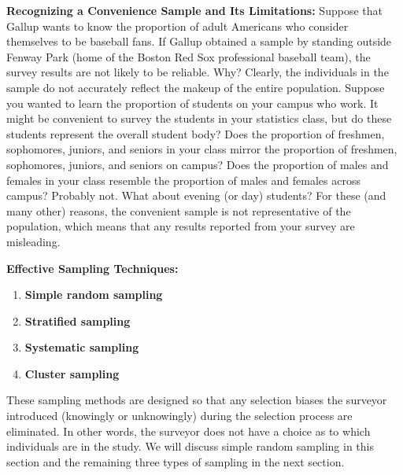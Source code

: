 \documentclass{report}
\begin{document}
        \bigbreak \noindent 
        \textbf{Recognizing a Convenience Sample and Its Limitations:}
        \bigbreak \noindent 
        Suppose that Gallup wants to know the proportion of adult Americans who consider themselves to be baseball fans. If Gallup obtained a sample by standing outside Fenway Park (home of the Boston Red Sox professional baseball team), the survey results are not likely to be reliable. Why? Clearly, the individuals in the sample do not accurately reflect the makeup of the entire population.
        \bigbreak \noindent 
        Suppose you wanted to learn the proportion of students on your campus who work. It might be convenient to survey the students in your statistics class, but do these students represent the overall student body? Does the proportion of freshmen, sophomores, juniors, and seniors in your class mirror the proportion of freshmen, sophomores, juniors, and seniors on campus? Does the proportion of males and females in your class resemble the proportion of males and females across campus? Probably not. What about evening (or day) students? For these (and many other) reasons, the convenient sample is not representative of the population, which means that any results reported from your survey are misleading.

        \bigbreak \noindent 
        \textbf{Effective Sampling Techniques:}
        \begin{enumerate}
            \item \textbf{Simple random sampling}
            \item \textbf{Stratified sampling}
            \item \textbf{Systematic sampling}
            \item \textbf{Cluster sampling}
        \end{enumerate}
        \bigbreak \noindent 
        These sampling methods are designed so that any selection biases the surveyor introduced (knowingly or unknowingly) during the selection process are eliminated. In other words, the surveyor does not have a choice as to which individuals are in the study. We will discuss simple random sampling in this section and the remaining three types of sampling in the next section.
\end{document}
